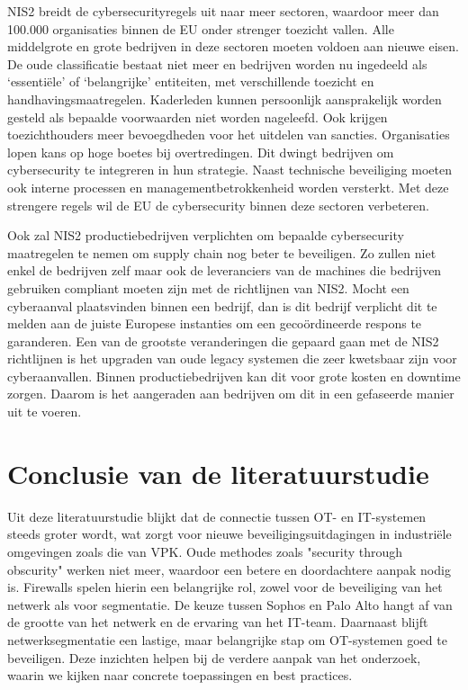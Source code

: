 \vspace{5mm}
NIS2 breidt de cybersecurityregels uit naar meer sectoren, waardoor meer dan 100.000 organisaties binnen de EU onder strenger toezicht vallen. Alle middelgrote en grote bedrijven in deze sectoren moeten voldoen aan nieuwe eisen. De oude classificatie bestaat niet meer en bedrijven worden nu ingedeeld als ‘essentiële’ of ‘belangrijke’ entiteiten, met verschillende toezicht en handhavingsmaatregelen. Kaderleden kunnen persoonlijk aansprakelijk worden gesteld als bepaalde voorwaarden niet worden nageleefd. Ook krijgen toezichthouders meer bevoegdheden voor het uitdelen van sancties. Organisaties lopen kans op hoge boetes bij overtredingen. Dit dwingt bedrijven om cybersecurity te integreren in hun strategie. Naast technische beveiliging moeten ook interne processen en managementbetrokkenheid worden versterkt. Met deze strengere regels wil de EU de cybersecurity binnen deze sectoren verbeteren. \autocite{Ey2025}

\vspace{5mm}
Ook zal NIS2 productiebedrijven verplichten om bepaalde cybersecurity maatregelen te nemen om supply chain nog beter te beveiligen. Zo zullen niet enkel de bedrijven zelf maar ook de leveranciers van de machines die bedrijven gebruiken compliant moeten zijn met de richtlijnen van NIS2. Mocht een cyberaanval plaatsvinden binnen een bedrijf, dan is dit bedrijf verplicht dit te melden aan de juiste Europese instanties om een gecoördineerde respons te garanderen. Een van de grootste veranderingen die gepaard gaan met de NIS2 richtlijnen is het upgraden van oude legacy systemen die zeer kwetsbaar zijn voor cyberaanvallen. Binnen productiebedrijven kan dit voor grote kosten en downtime zorgen. Daarom is het aangeraden aan bedrijven om dit in een gefaseerde manier uit te voeren. \autocite{Lansweeper2024}


\section{Conclusie van de literatuurstudie}
Uit deze literatuurstudie blijkt dat de connectie tussen OT- en IT-systemen steeds groter wordt, wat zorgt voor nieuwe beveiligingsuitdagingen in industriële omgevingen zoals die van VPK. Oude methodes zoals "security through obscurity" werken niet meer, waardoor een betere en doordachtere aanpak nodig is. Firewalls spelen hierin een belangrijke rol, zowel voor de beveiliging van het netwerk als voor segmentatie. De keuze tussen Sophos en Palo Alto hangt af van de grootte van het netwerk en de ervaring van het IT-team. Daarnaast blijft netwerksegmentatie een lastige, maar belangrijke stap om OT-systemen goed te beveiligen. Deze inzichten helpen bij de verdere aanpak van het onderzoek, waarin we kijken naar concrete toepassingen en best practices.
















